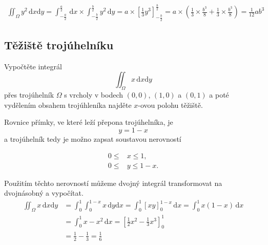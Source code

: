 \reseni


$$
\begin{aligned}
  \iint_\Omega y^2\,\mathrm dx \mathrm dy
  = \int_{-\frac a2}^{\frac a2} \,\mathrm dx \times \int_{-\frac b2}^{\frac b2}y^2\,\mathrm dy=a\times \left[\frac 13 y^3\right]_{-\frac b2}^{\frac b2}=a\times \left(\frac 13 \times \frac {b^3}{8} + \frac 13 \times \frac {b^3}{8}\right)=
  \frac 1{12}ab^3
\end{aligned}
$$

\konec



\subsection{Těžiště trojúhelníku}




Vypočtěte integrál
$$  \iint_\Omega x\,\mathrm dx \mathrm dy
$$
přes trojúhelník $\Omega$ s vrcholy v bodech $(0,0)$, $(1,0)$ a $(0,1)$ a poté vydělením obsahem trojúhleníka najděte $x$-ovou polohu těžiště.

\reseni

Rovnice přímky, ve které leží přepona trojúhelníka, je
$$y=1-x$$ a trojúhelník tedy je možno zapsat soustavou nerovností

$$
\begin{aligned}
  0\leq &x\leq 1,\\
  0\leq &y \leq 1-x.
\end{aligned}
$$

Použitím těchto nerovností můžeme dvojný integrál transformovat na dvojnásobný a vypočítat.
$$
\begin{aligned}
  \iint_\Omega x\,\mathrm dx\mathrm dy
  &=\int_0^1 \int_0^{1-x} x\,\mathrm dy\mathrm dx
  =\int_0^1 \left[xy\right]_0^{1-x}\,\mathrm dx
  =\int_0^1 x(1-x)\,\mathrm dx
  \\&=\int_0^1 x-x^2\,\mathrm dx
  =\left[\frac 12 x^2 - \frac 13 x^3\right]_0^1
  \\&=\frac 12 -\frac 13 =\frac 1{6}
\end{aligned}
$$

